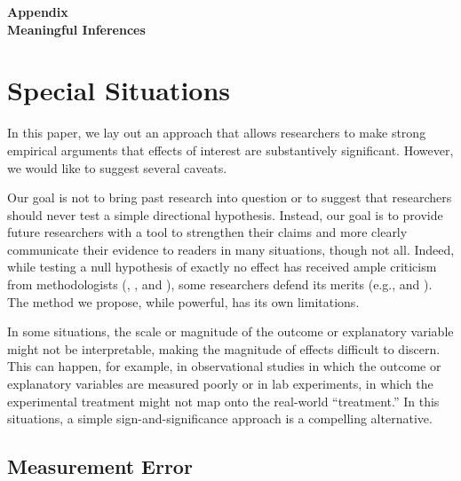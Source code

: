 \documentclass[12pt]{article}
\begin{document}
\newpage
\doublespace
\begin{appendix}
\begin{center}
\textbf{{\LARGE Appendix}}\\\vspace{2mm}
\textbf{{\large Meaningful Inferences}}\\\vspace{2mm}

\end{center}
\section{Special Situations}

In this paper, we lay out an approach that allows researchers to make strong empirical arguments that effects of interest are substantively significant. However, we would like to suggest several caveats.

Our goal is not to bring past research into question or to suggest that researchers should never test a simple directional hypothesis. Instead, our goal is to provide future researchers with a tool to strengthen their claims and more clearly communicate their evidence to readers in many situations, though not all. Indeed, while testing a null hypothesis of exactly no effect has received ample criticism from methodologists (\citealt{Gill1999}, \citealt{Gross2014}, and \citealt{HillJones2014}), some researchers defend its merits (e.g., \citealt{Hagen1997} and \citealt{Wainer1999}). The method we propose, while powerful, has its own limitations.

In some situations, the scale or magnitude of the outcome or explanatory variable might not be interpretable, making the magnitude of effects difficult to discern. This can happen, for example, in observational studies in which the outcome or explanatory variables are measured poorly or in lab experiments, in which the experimental treatment might not map onto the real-world ``treatment.'' In this situations, a simple sign-and-significance approach is a compelling alternative.

\subsection*{Measurement Error}



\end{appendix}
\end{document}
